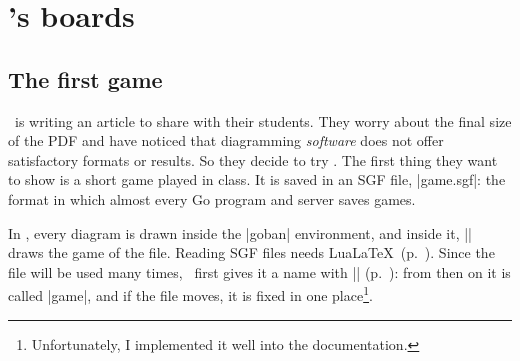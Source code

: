 \section{\karu's boards}

\subsection{The first game}
\label{tut:primera}

\karu\ is writing an article to share with their students. They worry about the final size of the PDF and have noticed that diagramming \emph{software} does not offer satisfactory formats or results. So they decide to try \pgfgoname. The first thing they want to show is a short game played in class. It is saved in an SGF file, |game.sgf|: the format in which almost every Go program and server saves games.

\begin{figure}[H]
	\centering
	\begin{goban}[captures, label = {at = {north, west}}]
	\end{goban}
\end{figure}

In \pgfgoname, every diagram is drawn inside the |goban| environment, and inside it, |\sgf| draws the game of the file. Reading SGF files needs Lua\LaTeX\ (p.~\pageref{subsec:kernel}). Since the file will be used many times, \karu\ first gives it a name with |\pgfgodefinesgf| (p.~\pageref{subsec:sgfnombres}): from then on it is called |game|, and if the file moves, it is fixed in one place\footnote{Unfortunately, I implemented it well into the documentation.}.

\begin{codeexample}[width=4.8cm]

\begin{goban}
\end{goban}
\end{codeexample}

